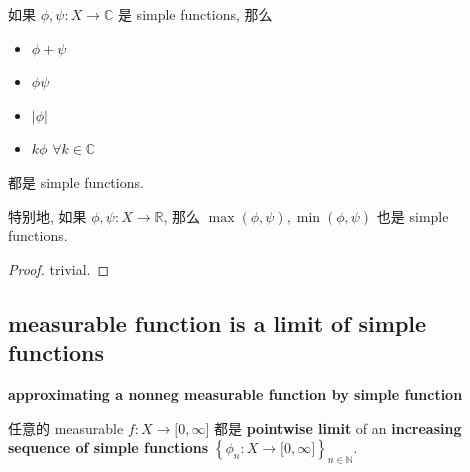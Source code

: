 \documentclass{qlnotes-export}
\begin{document}
\begin{lemma}

如果 \(\phi,\psi:X\rightarrow{\mathbb{C}}\) 是 simple functions, 那么

\begin{itemize}
\item
  \(\phi + \psi\)
\item
  \(\phi\psi\)
\item
  \(|\phi|\)
\item
  \(k\phi\) \(\forall k \in {\mathbb{C}}\)
\end{itemize}

都是 simple functions.

特别地, 如果 \(\phi,\psi:X\rightarrow{\mathbb{R}}\), 那么 \(\max(\phi,\psi),\min(\phi,\psi)\) 也是 simple functions.

\end{lemma}

\begin{proof}

trivial.

\end{proof}

\subsection{measurable function is a limit of simple functions}\label{measurable-function-is-a-limit-of-simple-functions}

\begin{theorem}{\protect{}\label{kn-approximating-a-nonneg-measurable-function-by-simple-function}{\textbf{approximating
a nonneg measurable function by simple function}}}\label{thm-04-measurable-functions-and-integration-on-l-mu-approximating-a-nonneg-measurable-function-by-simple-function}

任意的 measurable \(f:X\rightarrow\lbrack 0,\infty\rbrack\) 都是 \textbf{pointwise limit} of an \textbf{increasing sequence of simple functions} \(\left\{ {\phi_{n}:X\rightarrow\lbrack 0,\infty\rbrack} \right\}_{n \in {\mathbb{N}}}\).

\end{theorem}
\end{document}
